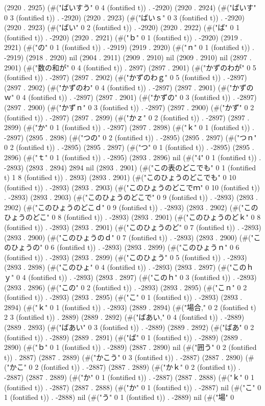 (2920 . 2925) (#("ばいすう" 0 4 (fontified t)) . -2920) (2920 . 2924) (#("ばいす" 0 3 (fontified t)) . -2920) (2920 . 2923) (#("ばいｓ" 0 3 (fontified t)) . -2920) (2920 . 2923) (#("ばい" 0 2 (fontified t)) . -2920) (2920 . 2922) (#("ば" 0 1 (fontified t)) . -2920) (2920 . 2921) (#("ｂ" 0 1 (fontified t)) . -2920) (2919 . 2921) (#("の" 0 1 (fontified t)) . -2919) (2919 . 2920) (#("ｎ" 0 1 (fontified t)) . -2919) (2918 . 2920) nil (2904 . 2911) (2909 . 2910) nil (2909 . 2910) nil (2897 . 2901) (#("数の和が" 0 4 (fontified t)) . 2897) (2897 . 2901) (#("かずのわが" 0 5 (fontified t)) . -2897) (2897 . 2902) (#("かずのわｇ" 0 5 (fontified t)) . -2897) (2897 . 2902) (#("かずのわ" 0 4 (fontified t)) . -2897) (2897 . 2901) (#("かずのｗ" 0 4 (fontified t)) . -2897) (2897 . 2901) (#("かずの" 0 3 (fontified t)) . -2897) (2897 . 2900) (#("かずｎ" 0 3 (fontified t)) . -2897) (2897 . 2900) (#("かず" 0 2 (fontified t)) . -2897) (2897 . 2899) (#("かｚ" 0 2 (fontified t)) . -2897) (2897 . 2899) (#("か" 0 1 (fontified t)) . -2897) (2897 . 2898) (#("ｋ" 0 1 (fontified t)) . -2897) (2895 . 2898) (#("つの" 0 2 (fontified t)) . -2895) (2895 . 2897) (#("つｎ" 0 2 (fontified t)) . -2895) (2895 . 2897) (#("つ" 0 1 (fontified t)) . -2895) (2895 . 2896) (#("ｔ" 0 1 (fontified t)) . -2895) (2893 . 2896) nil (#("4" 0 1 (fontified t)) . -2893) (2893 . 2894) 2894 nil (2893 . 2901) (#("この表のどこでも" 0 1 (fontified t) 1 8 (fontified t)) . 2893) (2893 . 2901) (#("このひょうのどこでも" 0 10 (fontified t)) . -2893) (2893 . 2903) (#("このひょうのどこでｍ" 0 10 (fontified t)) . -2893) (2893 . 2903) (#("このひょうのどこで" 0 9 (fontified t)) . -2893) (2893 . 2902) (#("このひょうのどこｄ" 0 9 (fontified t)) . -2893) (2893 . 2902) (#("このひょうのどこ" 0 8 (fontified t)) . -2893) (2893 . 2901) (#("このひょうのどｋ" 0 8 (fontified t)) . -2893) (2893 . 2901) (#("このひょうのど" 0 7 (fontified t)) . -2893) (2893 . 2900) (#("このひょうのｄ" 0 7 (fontified t)) . -2893) (2893 . 2900) (#("このひょうの" 0 6 (fontified t)) . -2893) (2893 . 2899) (#("このひょうｎ" 0 6 (fontified t)) . -2893) (2893 . 2899) (#("このひょう" 0 5 (fontified t)) . -2893) (2893 . 2898) (#("このひょ" 0 4 (fontified t)) . -2893) (2893 . 2897) (#("このｈｙ" 0 4 (fontified t)) . -2893) (2893 . 2897) (#("このｈ" 0 3 (fontified t)) . -2893) (2893 . 2896) (#("この" 0 2 (fontified t)) . -2893) (2893 . 2895) (#("こｎ" 0 2 (fontified t)) . -2893) (2893 . 2895) (#("こ" 0 1 (fontified t)) . -2893) (2893 . 2894) (#("ｋ" 0 1 (fontified t)) . -2893) (2889 . 2894) (#("場合," 0 2 (fontified t) 2 3 (fontified t)) . 2889) (2889 . 2892) (#("ばあい," 0 4 (fontified t)) . -2889) (2889 . 2893) (#("ばあい" 0 3 (fontified t)) . -2889) (2889 . 2892) (#("ばあ" 0 2 (fontified t)) . -2889) (2889 . 2891) (#("ば" 0 1 (fontified t)) . -2889) (2889 . 2890) (#("ｂ" 0 1 (fontified t)) . -2889) (2887 . 2890) nil (#("囲う" 0 2 (fontified t)) . 2887) (2887 . 2889) (#("かこう" 0 3 (fontified t)) . -2887) (2887 . 2890) (#("かこ" 0 2 (fontified t)) . -2887) (2887 . 2889) (#("かｋ" 0 2 (fontified t)) . -2887) (2887 . 2889) (#("か" 0 1 (fontified t)) . -2887) (2887 . 2888) (#("ｋ" 0 1 (fontified t)) . -2887) (2887 . 2888) (#("か" 0 1 (fontified t)) . -2887) nil (#("こ" 0 1 (fontified t)) . -2888) nil (#("う" 0 1 (fontified t)) . -2889) nil (#("場" 0 